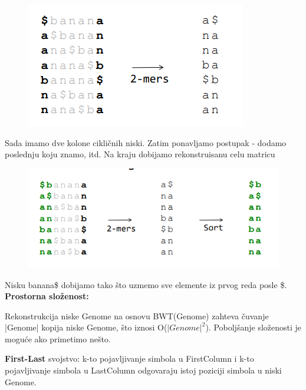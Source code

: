 \begin{figure}[h]
\centering
\includegraphics[scale=0.7]{poglavlja/9/slike/2-gramskiSastav.png}
\caption{}
\label{slika:X}
\end{figure}

Sada imamo dve kolone cikličnih niski. Zatim ponavljamo postupak - dodamo poslednju koju znamo, itd. Na kraju dobijamo rekonstruisanu celu matricu

\begin{figure}[h!]
\centering
\includegraphics[scale=0.5]{poglavlja/9/slike/2-gramskiSastav2.png}
\caption{}
\label{slika:X}
\end{figure}

Nisku banana\$ dobijamo tako što uzmemo sve elemente iz prvog reda posle \$.
\newpage
\textbf{Prostorna složenost:}

Rekonstrukcija niske Genome na osnovu BWT(Genome) zahteva čuvanje |Genome| kopija niske Genome, što iznosi O($|Genome|^2$). Poboljšanje složenosti je moguće ako primetimo nešto.

\textbf{First-Last} svojstvo: k-to pojavljivanje simbola u FirstColumn i k-to pojavljivanje simbola u LastColumn odgovaraju istoj poziciji simbola u niski Genome.

